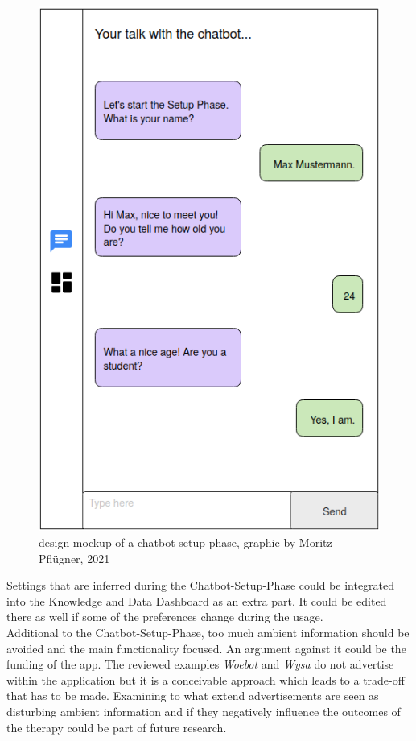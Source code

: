 \documentclass[sigconf, nonacm]{acmart}
\begin{document}
\begin{figure}[h]
  \includegraphics[width=\linewidth]{chatbot_setup_phase}
  \caption{design mockup of a chatbot setup phase, graphic by Moritz Pflügner, 2021}
  \label{fig:setup_phase}
\end{figure}
Settings that are inferred during the Chatbot-Setup-Phase could be integrated into the Knowledge and Data Dashboard as an extra part. It could be edited there as well if some of the preferences change during the usage.
\\
Additional to the Chatbot-Setup-Phase, too much ambient information should be avoided and the main functionality focused. An argument against it could be the funding of the app. The reviewed examples \emph{Woebot} and \emph{Wysa} do not advertise within the application but it is a conceivable approach which leads 
to a trade-off that has to be made. Examining to what extend advertisements are seen as disturbing ambient information and if they negatively influence the outcomes of the therapy could be part of future research. 
\\
\end{document}
